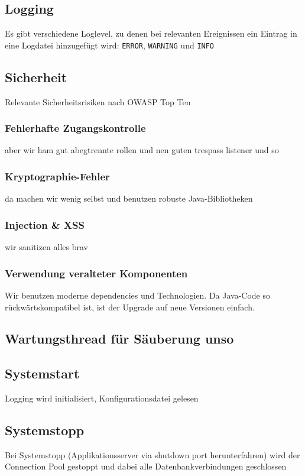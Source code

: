 
\subsection{Logging}\label{subsec:logging}
Es gibt verschiedene Loglevel, zu denen bei relevanten Ereignissen ein Eintrag in eine Logdatei hinzugefügt wird: \texttt{ERROR}, \texttt{WARNING} und \texttt{INFO}

\subsection{Sicherheit}\label{subsec:sicherheit}
Relevante Sicherheitsrisiken nach OWASP Top Ten 

\subsubsection*{Fehlerhafte Zugangskontrolle}
aber wir ham gut abegtrennte rollen und nen guten trespass listener und so

\subsubsection*{Kryptographie-Fehler}
da machen wir wenig selbst und benutzen robuste Java-Bibliotheken

\subsubsection*{Injection \& XSS}
wir sanitizen alles brav

\subsubsection*{Verwendung veralteter Komponenten}
Wir benutzen moderne dependencies und Technologien.
Da Java-Code so rückwärtskompatibel ist, ist der Upgrade auf neue Versionen einfach.

\subsection{Wartungsthread für Säuberung unso}\label{subsec:wartungsthread}

\subsection{Systemstart}\label{subsec:systemstart}
Logging wird initialisiert, Konfigurationsdatei gelesen

\subsection{Systemstopp}\label{subsec:systemstopp}
Bei Systemstopp (Applikationsserver via shutdown port herunterfahren) wird der Connection Pool gestoppt und dabei alle Datenbankverbindungen geschlossen